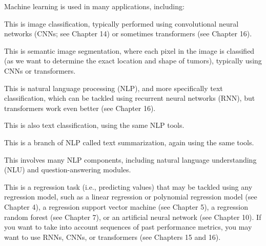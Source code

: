Machine learning is used in many applications, including:
\begin{nobullet}
    \begin{nobullet}
        \item This is image classification, typically performed using convolutional neural networks (CNNs; see Chapter 14) or sometimes transformers (see Chapter 16).
    \end{nobullet}
    \begin{nobullet}
        \item This is semantic image segmentation, where each pixel in the image is classified (as we want to determine the exact location and shape of tumors), typically using CNNs or transformers.
    \end{nobullet}
    \begin{nobullet}
        \item This is natural language processing (NLP), and more specifically text classification, which can be tackled using recurrent neural networks (RNN), but transformers work even better (see Chapter 16).
    \end{nobullet}
    \begin{nobullet}
        \item This is also text classification, using the same NLP tools.
    \end{nobullet}
    \begin{nobullet}
        \item This is a branch of NLP called text summarization, again using the same tools.
    \end{nobullet}
    \begin{nobullet}
        \item This involves many NLP components, including natural language understanding (NLU) and question-answering modules.
    \end{nobullet}
    \begin{nobullet}
        \item This is a regression task (i.e., predicting values) that may be tackled using any regression model, such as a linear regression or polynomial regression model (see Chapter 4), a regression support vector machine (see Chapter 5), a regression random forest (see Chapter 7), or an artificial neural network (see Chapter 10). If you want to take into account sequences of past performance metrics, you may want to use RNNs, CNNs, or transformers (see Chapters 15 and 16).

\end{nobullet}
\end{nobullet}
